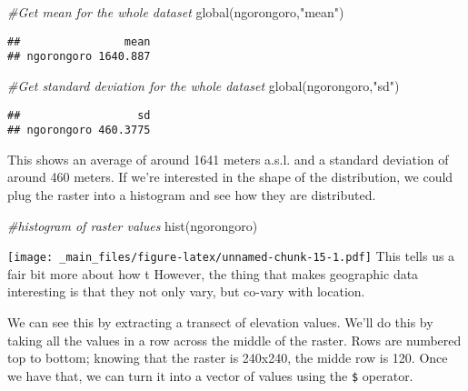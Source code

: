 \documentclass[
]{book}
\newenvironment{Shaded}{\begin{snugshade}}{\end{snugshade}}
\newcommand{\CommentTok}[1]{\textcolor[rgb]{0.56,0.35,0.01}{\textit{#1}}}
\newcommand{\DecValTok}[1]{\textcolor[rgb]{0.00,0.00,0.81}{#1}}
\newcommand{\FunctionTok}[1]{\textcolor[rgb]{0.00,0.00,0.00}{#1}}
\newcommand{\NormalTok}[1]{#1}
\newcommand{\OtherTok}[1]{\textcolor[rgb]{0.56,0.35,0.01}{#1}}
\newcommand{\SpecialCharTok}[1]{\textcolor[rgb]{0.00,0.00,0.00}{#1}}
\newcommand{\StringTok}[1]{\textcolor[rgb]{0.31,0.60,0.02}{#1}}
\begin{document}
\begin{Shaded}
\begin{Highlighting}[]
\CommentTok{\#Get mean for the whole dataset}
\FunctionTok{global}\NormalTok{(ngorongoro,}\StringTok{"mean"}\NormalTok{)}
\end{Highlighting}
\end{Shaded}

\begin{verbatim}
##                mean
## ngorongoro 1640.887
\end{verbatim}

\begin{Shaded}
\begin{Highlighting}[]
\CommentTok{\#Get standard deviation for the whole dataset}
\FunctionTok{global}\NormalTok{(ngorongoro,}\StringTok{"sd"}\NormalTok{)}
\end{Highlighting}
\end{Shaded}

\begin{verbatim}
##                  sd
## ngorongoro 460.3775
\end{verbatim}

This shows an average of around 1641 meters a.s.l. and a standard deviation of around 460 meters. If we're interested in the shape of the distribution, we could plug the raster into a histogram and see how they are distributed.

\begin{Shaded}
\begin{Highlighting}[]
\CommentTok{\#histogram of raster values}
\FunctionTok{hist}\NormalTok{(ngorongoro)}
\end{Highlighting}
\end{Shaded}

\texttt{[image: \_main\_files/figure-latex/unnamed-chunk-15-1.pdf]}
This tells us a fair bit more about how t However, the thing that makes geographic data interesting is that they not only vary, but co-vary with location.

We can see this by extracting a transect of elevation values. We'll do this by taking all the values in a row across the middle of the raster. Rows are numbered top to bottom; knowing that the raster is 240x240, the midde row is 120. Once we have that, we can turn it into a vector of values using the \texttt{\$} operator.

\begin{Shaded}
\end{Shaded}
\end{document}

